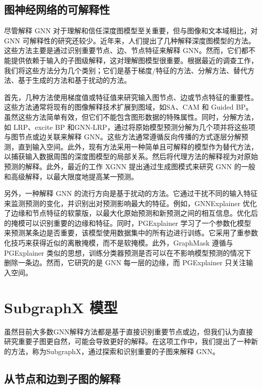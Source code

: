\documentclass[final]{cvpr}
\begin{document}
\subsection{图神经网络的可解释性}

尽管解释 GNN 对于理解和信任深度图模型至关重要，但与图像和文本域相比，对 GNN 可解释性的研究还较少。近年来，人们提出了几种解释深度图模型的方法。这些方法主要是通过识别重要节点、边、节点特征来解释 GNN。然而，它们都不能提供依赖于输入的子图级解释，这对理解图模型很重要。根据最近的调查工作，我们将这些方法分为几个类别；它们是基于梯度/特征的方法、分解方法、替代方法、基于生成的方法和基于扰动的方法。

首先，几种方法使用梯度值或特征值来研究输入图节点、边或节点特征的重要性。这些方法通常将现有的图像解释技术扩展到图域，如SA、CAM 和 Guided BP。虽然这些方法简单有效，但它们不能包含图形数据的特殊属性。同时，分解方法，如 LRP、excite BP 和GNN-LRP，通过将原始模型预测分解为几个项并将这些项与图节点或边关联来解释 GNN。这些方法通常遵循反向传播的方式逐层分解预测，直到输入空间。此外，现有方法采用一种简单且可解释的模型作为替代方法，以捕获输入数据周围的深度图模型的局部关系。然后将代理方法的解释视为对原始预测的解释。此外，最近的工作 XGNN 提出通过生成图模式来研究 GNN 的一般和高级解释，以最大限度地提高某一预测。

另外，一种解释 GNN 的流行方向是基于扰动的方法。它通过干扰不同的输入特征来监测预测的变化，并识别出对预测影响最大的特征。例如，GNNExplainer 优化了边缘和节点特征的软蒙版，以最大化原始预测和新预测之间的相互信息。优化后的掩模可以识别重要的边缘和特征。同时，PGExplainer 学习了一个参数化模型来预测某条边是否重要，该模型使用数据集中的所有边进行训练。它采用了重参数化技巧来获得近似的离散掩模，而不是软掩模。此外，GraphMask 遵循与 PGExplainer 类似的思想，训练分类器预测是否可以在不影响模型预测的情况下删除一条边。然而，它研究的是 GNN 每一层的边缘，而 PGExplainer 只关注输入空间。


\section{SubgraphX 模型} \label{sec:subgraphx}

虽然目前大多数GNN解释方法都是基于直接识别重要节点或边，但我们认为直接研究重要子图更自然，可能会导致更好的解释。在这项工作中，我们提出了一种新的方法，称为SubgraphX，通过探索和识别重要的子图来解释 GNN。


\subsection{从节点和边到子图的解释}
\end{document}
